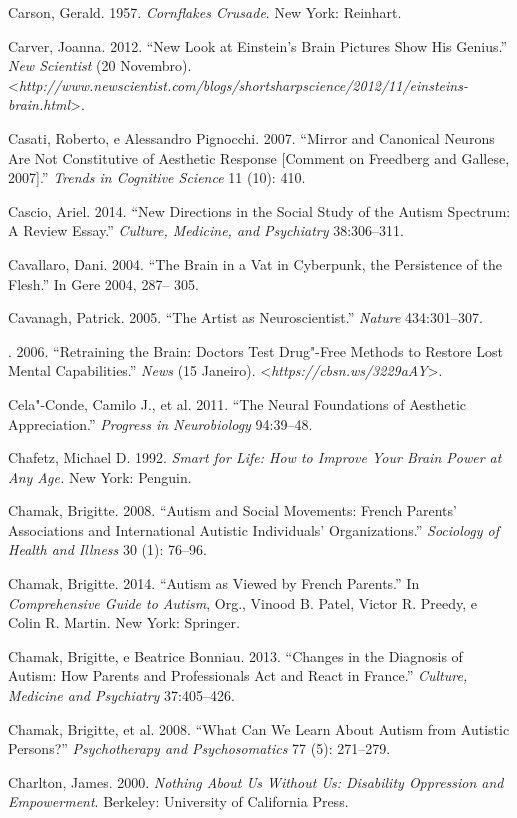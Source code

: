 {\begin{Parskip}
Carson, Gerald. 1957. \emph{Cornflakes Crusade}. New York: Reinhart.

Carver, Joanna. 2012. ``New Look at Einstein's Brain Pictures Show His
Genius.'' \emph{New Scientist} (20 Novembro).
\textless{}\emph{http://www.newscientist.com/blogs/shortsharpscience/2012/11/einsteins-brain.html}\textgreater{}.

Casati, Roberto, e Alessandro Pignocchi. 2007. ``Mirror and Canonical
Neurons Are Not Constitutive of Aesthetic Response {[}Comment on
Freedberg and Gallese, 2007{]}.'' \emph{Trends in Cognitive Science} 11
(10): 410.

Cascio, Ariel. 2014. ``New Directions in the Social Study of the Autism
Spectrum: A Review Essay.'' \emph{Culture, Medicine, and Psychiatry}
38:306--311.

Cavallaro, Dani. 2004. ``The Brain in a Vat in Cyberpunk, the
Persistence of the Flesh.'' In Gere 2004, 287-- 305.

Cavanagh, Patrick. 2005. ``The Artist as Neuroscientist.'' \emph{Nature}
434:301--307.

. 2006. ``Retraining the Brain: Doctors Test Drug"-Free Methods to
Restore Lost Mental Capabilities.'' \emph{ News} (15 Janeiro).
\textless{}\emph{https://cbsn.ws/3229aAY}\textgreater{}.

Cela"-Conde, Camilo J., et al. 2011. ``The Neural Foundations of
Aesthetic Appreciation.'' \emph{Progress in Neurobiology} 94:39--48.

Chafetz, Michael D. 1992. \emph{Smart for Life: How to Improve Your
Brain Power at Any Age.} New York: Penguin.

Chamak, Brigitte. 2008. ``Autism and Social Movements: French Parents'
Associations and International Autistic Individuals' Organizations.''
\emph{Sociology of Health and Illness} 30 (1): 76--96.

Chamak, Brigitte. 2014. ``Autism as Viewed by French Parents.'' In
\emph{Comprehensive Guide to Autism}, Org., Vinood B. Patel, Victor R.
Preedy, e Colin R. Martin. New York: Springer.

Chamak, Brigitte, e Beatrice Bonniau. 2013. ``Changes in the Diagnosis
of Autism: How Parents and Professionals Act and React in France.''
\emph{Culture, Medicine and Psychiatry} 37:405--426.

Chamak, Brigitte, et al. 2008. ``What Can We Learn About Autism from
Autistic Persons?'' \emph{Psychotherapy and Psychosomatics} 77 (5):
271--279.

Charlton, James. 2000. \emph{Nothing About Us Without Us: Disability
Oppression and Empowerment}. Berkeley: University of California Press.


\end{Parskip}}
